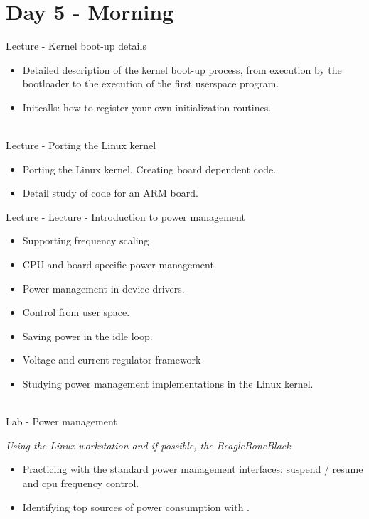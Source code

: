 \documentclass[a4paper,12pt,obeyspaces,spaces,hyphens]{article}
\begin{document}
\section{Day 5 - Morning}
\feagendaonecolumn
{Lecture - Kernel boot-up details}
{
  \begin{itemize}
  \item Detailed description of the kernel boot-up process, from
    execution by the bootloader to the execution of the first
    userspace program.
  \item Initcalls: how to register your own initialization routines.
  \end{itemize}
}
\\
\feagendatwocolumn
{Lecture - Porting the Linux kernel}
{
  \begin{itemize}
  \item Porting the Linux kernel. Creating board dependent code.
  \item Detail study of code for an ARM board.
  \end{itemize}
}
{Lecture - Lecture - Introduction to power management}
{
  \begin{itemize}
  \item Supporting frequency scaling
  \item CPU and board specific power management.
  \item Power management in device drivers.
  \item Control from user space.
  \item Saving power in the idle loop.
  \item Voltage and current regulator framework
  \item Studying power management implementations in the Linux kernel.
  \end{itemize}
}
\\
\feagendaonecolumn
{Lab - Power management}
{
  {\em Using the Linux workstation and if possible, the BeagleBoneBlack}
  \begin{itemize}
  \item Practicing with the standard power management interfaces:
    suspend / resume and cpu frequency control.
  \item Identifying top sources of power consumption with
    .
  \end{itemize}
}
\end{document}
